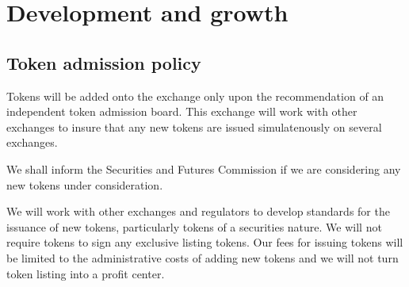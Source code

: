 \chapter{Development and growth}
\section{Token admission policy}
Tokens will be added onto the exchange only upon the recommendation of
an independent token admission board.  This exchange will work with
other exchanges to insure that any new tokens are issued
simulatenously on several exchanges.

We shall inform the Securities and Futures Commission if we are
considering any new tokens under consideration.

We will work with other exchanges and regulators to develop standards
for the issuance of new tokens, particularly tokens of a securities
nature.  We will not require tokens to sign any exclusive listing
tokens.  Our fees for issuing tokens will be limited to the
administrative costs of adding new tokens and we will not turn token
listing into a profit center.

